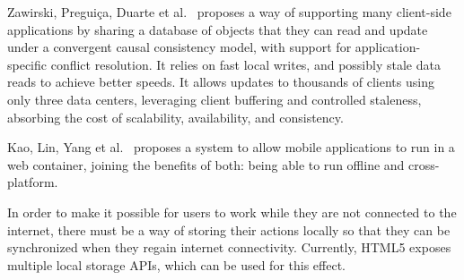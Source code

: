 Zawirski, Preguiça, Duarte et al.\ \cite{Zawirski2015} proposes a way of supporting many client-side applications by sharing a database of objects that they can read and update under a convergent causal consistency model, with support for application-specific conflict resolution. It relies on fast local writes, and possibly stale data reads to achieve better speeds. It allows updates to thousands of clients using only three data centers, leveraging client buffering and controlled staleness, absorbing the cost of scalability, availability, and consistency.

Kao, Lin, Yang et al.\ \cite{Kao2012} proposes a system to allow mobile applications to run in a web container, joining the benefits of both: being able to run offline and cross-platform.

In order to make it possible for users to work while they are not connected to the internet, there must be a way of storing their actions locally so that they can be synchronized when they regain internet connectivity. Currently, HTML5 exposes multiple local storage APIs, which can be used for this effect.

